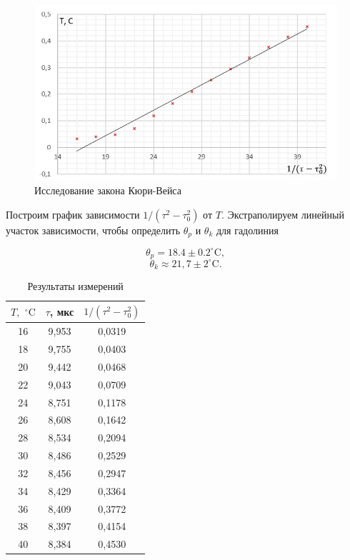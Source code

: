 \documentclass[a4paper]{article}
\theoremstyle{definition}
\theoremstyle{remark}
\begin{document}
\begin{figure}[h!]
    \centering
    \includegraphics[width=\linewidth]{image/pic1.jpg}
    \caption{Исследование закона Кюри-Вейса}
\end{figure}

Построим график зависимости $1 / (\tau^2 - \tau_0^2)$ от $T$. Экстраполируем линейный участок зависимости, чтобы определить $\theta_p$ и $\theta_k$ для гадолиния

    $$\theta_p = 18.4 \pm  0.2^{\circ} \mathrm{C},$$
    $$\theta_k \approx 21,7 \pm 2^{\circ} \mathrm{C}.$$

\begin{table}[h!]
    \centering
    \caption{Результаты измерений}
    \begin{tabular}{|c|c|c|}
    \hline
    $T,$ $^\circ \mathrm{C}$ & $\tau$, мкс & $1/(\tau^2 - \tau_0^2)$ \\ \hline
    16             & 9,953       & 0,0319                  \\ \hline
    18             & 9,755       & 0,0403                  \\ \hline
    20             & 9,442       & 0,0468                  \\ \hline
    22             & 9,043       & 0,0709                  \\ \hline
    24             & 8,751       & 0,1178                  \\ \hline
    26             & 8,608       & 0,1642                  \\ \hline
    28             & 8,534       & 0,2094                  \\ \hline
    30             & 8,486       & 0,2529                  \\ \hline
    32             & 8,456       & 0,2947                  \\ \hline
    34             & 8,429       & 0,3364                  \\ \hline
    36             & 8,409       & 0,3772                  \\ \hline
    38             & 8,397       & 0,4154                  \\ \hline
    40             & 8,384       & 0,4530                  \\ \hline
    \end{tabular}
    \end{table}
\end{document}
